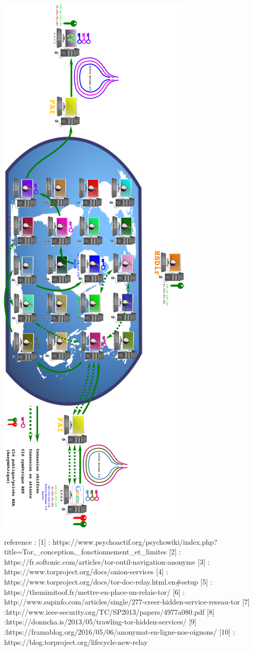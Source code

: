 \documentclass[]{article}
\begin{document}
\includegraphics{images/Echange_cle_HS.png}

reference : {[}1{]} :
https://www.psychoactif.org/psychowiki/index.php?title=Tor,\_conception,\_fonctionnement\_et\_limites
{[}2{]} : https://fr.softonic.com/articles/tor-outil-navigation-anonyme
{[}3{]} : https://www.torproject.org/docs/onion-services {[}4{]} :
https://www.torproject.org/docs/tor-doc-relay.html.en\#setup {[}5{]} :
https://themimitoof.fr/mettre-en-place-un-relais-tor/ {[}6{]} :
http://www.supinfo.com/articles/single/277-creer-hidden-service-reseau-tor
{[}7{]} :http://www.ieee-security.org/TC/SP2013/papers/4977a080.pdf
{[}8{]} :https://donncha.is/2013/05/trawling-tor-hidden-services/
{[}9{]} :https://framablog.org/2016/05/06/anonymat-en-ligne-nos-oignons/
{[}10{]} : https://blog.torproject.org/lifecycle-new-relay
\end{document}
